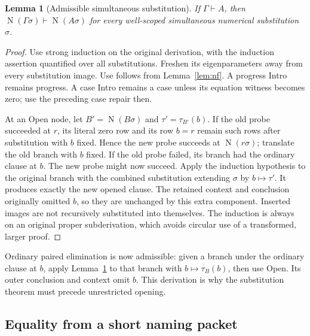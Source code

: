 \documentclass[11pt]{article}
\newtheorem{lemma}[theorem]{Lemma}
\theoremstyle{definition}
\theoremstyle{remark}
\newcommand{\NF}{\operatorname{N}}
\newcommand{\der}{\vdash}
\begin{document}
\begin{lemma}[Admissible simultaneous substitution]
\label{lem:substproof}
If $\Gamma\der A$, then
$\NF(\Gamma\sigma)\der\NF(A\sigma)$ for every well-scoped
simultaneous numerical substitution $\sigma$.
\end{lemma}
\begin{proof}
Use strong induction on the original derivation, with the
induction assertion quantified over all substitutions.
Freshen its eigenparameters away from every substitution image.
Use follows from Lemma~\ref{lem:nf}. A progress Intro remains
progress. A case Intro remains a case unless its equation
witness becomes zero; use the preceding case repair then.

At an Open node, let $B'=\NF(B\sigma)$ and
$\tau'=\tau_{B'}(b)$. If the old probe succeeded at $r$,
its literal zero row and its row $b=r$ remain such rows
after substitution with $b$ fixed. Hence the new probe
succeeds at $\NF(r\sigma)$; translate the old branch with
$b$ fixed.
If the old probe failed, its branch had the ordinary clause
at $b$. The new probe might now succeed. Apply the induction
hypothesis to the original branch with the combined
substitution extending $\sigma$ by $b\mapsto\tau'$.
It produces exactly the new opened clause.
The retained context and conclusion originally omitted
$b$, so they are unchanged by this extra component.
Inserted images are not recursively substituted into themselves.
The induction is always on an original proper subderivation,
which avoids circular use of a transformed, larger proof.
\end{proof}

Ordinary paired elimination is now admissible: given a
branch under the ordinary clause at $b$, apply
Lemma~\ref{lem:substproof} to that branch with
$b\mapsto\tau_B(b)$, then use Open. Its outer conclusion
and context omit $b$. This derivation is why the
substitution theorem must precede unrestricted opening.

\subsection{Equality from a short naming packet}
\end{document}
